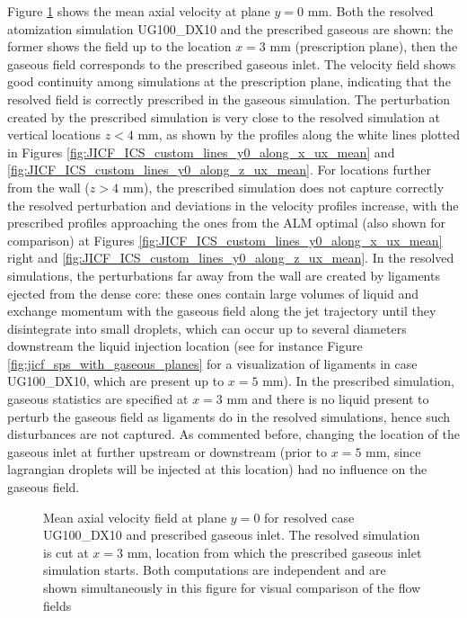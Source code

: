 Figure \ref{fig:custom_gas_fields_plane_Y} shows the mean axial velocity at plane $y = 0$ mm. Both the resolved atomization simulation UG100\_DX10 and the prescribed gaseous are shown: the former shows the field up to the location $x = 3$ mm (prescription plane), then the gaseous field corresponds to the prescribed gaseous inlet. The velocity field shows good continuity among simulations at the prescription plane, indicating that the resolved field is correctly prescribed in the gaseous simulation. The perturbation created by the prescribed simulation is very close to the resolved simulation at vertical locations $z < 4$ mm, as shown by the profiles along the white lines plotted in Figures \ref{fig:JICF_ICS_custom_lines_y0_along_x_ux_mean} and \ref{fig:JICF_ICS_custom_lines_y0_along_z_ux_mean}. For locations further from the wall ($z > 4$ mm), the prescribed simulation does not capture correctly the resolved perturbation and deviations in the velocity profiles increase, with the prescribed profiles approaching the ones from the ALM optimal (also shown for comparison) at Figures \ref{fig:JICF_ICS_custom_lines_y0_along_x_ux_mean} right and  \ref{fig:JICF_ICS_custom_lines_y0_along_z_ux_mean}. In the resolved simulations, the perturbations far away from the wall are created by ligaments ejected from the dense core: these ones contain large volumes of liquid and exchange momentum with the gaseous field along the jet trajectory until they disintegrate into small droplets, which can occur up to several diameters downstream the liquid injection location (see for instance Figure \ref{fig:jicf_sps_with_gaseous_planes} for a visualization of ligaments in case UG100\_DX10, which are present up to $x = 5$ mm). In the prescribed simulation, gaseous statistics are specified at $x = 3$ mm and there is no liquid present to perturb the gaseous field as ligaments do in the resolved simulations, hence such disturbances are not captured. As commented before, changing the location of the gaseous inlet at further upstream or downstream (prior to $x = 5$ mm, since lagrangian droplets will be injected at this location) had no influence on the gaseous field.

\begin{figure}[h!]	
	\centering	{}
	\caption[Mean axial velocity field at plane $y = 0$ for resolved case UG100\_DX10 and prescribed gaseous inlet]{Mean axial velocity field at plane $y = 0$ for resolved case UG100\_DX10 and prescribed gaseous inlet. The resolved simulation is cut at $x = 3$ mm, location from which the prescribed gaseous inlet simulation starts. Both computations are independent and are shown simultaneously in this figure for visual comparison of the flow fields}
	\label{fig:custom_gas_fields_plane_Y}
\end{figure}


